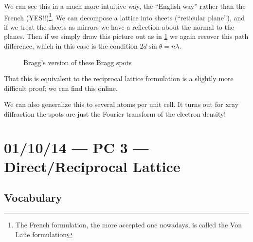 \documentclass[10pt]{report}
\begin{document}
We can see this in a much more intuitive way, the ``English way'' rather than the French (YES!!)\footnote{The French formulation, the more accepted one nowadays, is called the Von La\"ue formulation}. We can decompose a lattice into sheets (``reticular plane''), and if we treat the sheets as mirrors we have a reflection about the normal to the planes. Then if we simply draw this picture out as in \ref{01.10.2} we again recover this path difference, which in this case is the condition $2d\sin\theta = n\lambda$.
\begin{figure}[!h]
    \centering
    \caption{Bragg's version of these Bragg spots}
    \label{01.10.2}
\end{figure}

That this is equivalent to the reciprocal lattice formulation is a slightly more difficult proof; we can find this online.

We can also generalize this to several atoms per unit cell. It turns out for xray diffraction the spots are just the Fourier transform of the electron density!

\chapter{01/10/14 --- PC 3 --- Direct/Reciprocal Lattice}

\section{Vocabulary}
\end{document}
